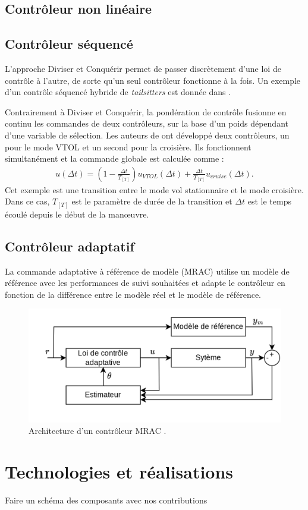 \subsection*{Contrôleur non linéaire}

\subsection*{Contrôleur séquencé}
L'approche Diviser et Conquérir permet de passer discrètement d'une loi de contrôle à l'autre, de sorte qu'un seul contrôleur fonctionne à la fois. Un exemple d'un contrôle séquencé hybride de \textit{tailsitters} est donnée dans \cite{Casau2011}.

Contrairement à Diviser et Conquérir, la pondération de contrôle fusionne en continu les commandes de deux contrôleurs, sur la base d'un poids dépendant d'une variable de sélection. Les auteurs de \cite{Liang2016} ont développé deux contrôleurs, un pour le mode VTOL et un second pour la croisière. Ils fonctionnent simultanément et la commande globale est calculée comme  :
\begin{align*}
    u(\Delta t) = (1 - \frac{\Delta t}{T_[T]})u_{VTOL}(\Delta t) + \frac{\Delta t}{T_[T]}u_{cruise}(\Delta t).
\end{align*}
Cet exemple est une transition entre le mode vol stationnaire et le mode croisière. Dans ce cas, $T_[T]$ est le paramètre de durée de la transition et $\Delta t$ est le temps écoulé depuis le début de la manœuvre.

\subsection*{Contrôleur adaptatif}
La commande adaptative à référence de modèle (MRAC) utilise un modèle de référence avec les performances de suivi souhaitées et adapte le contrôleur en fonction de la différence entre le modèle réel et le modèle de référence.

\begin{figure}[ht!]
    \centerline{
    \includegraphics[trim=0cm 0cm 0cm 0cm,clip,width=0.5\columnwidth]{figures/Mrac.png}}
    \caption{Architecture d'un contrôleur MRAC .}
    \label{fig:schemaMRAC}
\end{figure}


\section{Technologies et réalisations}
Faire un schéma des composants avec nos contributions

